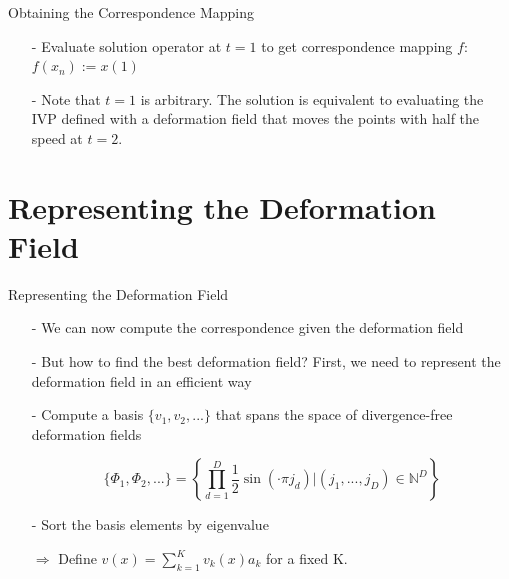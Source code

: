 \documentclass[xcolor=dvipsnames]{beamer}
\begin{document}
\begin{frame}{Obtaining the Correspondence Mapping}
\begin{enumerate}
\item[-] Evaluate solution operator at $t=1$ to get correspondence mapping $f$:\\ $f(x_n) := x(1)$
\item[-] Note that $t=1$ is arbitrary. The solution is equivalent to evaluating the IVP defined with a deformation field that moves the points with half the speed at $t=2$.
\end{enumerate}
\end{frame}

\section{Representing the Deformation Field}
\begin{frame}{Representing the Deformation Field}
\begin{enumerate}
\item[-] We can now compute the correspondence given the deformation field
\item[-]But how to find the best deformation field? First, we need to represent the deformation field in an efficient way
\item[-] Compute a basis $\{v_1,v_2,...\}$ that spans the space of divergence-free deformation fields
\item[] \begin{equation*}
\{\Phi_1,\Phi_2,...\} = \left\{\prod_{d=1}^D \frac{1}{2}\sin(\cdot\pi j_d) \vert (j_1,...,j_D) \in \mathbb{N}^D\right\}
\end{equation*}
\item[-] Sort the basis elements by eigenvalue
\item[$\Rightarrow$] Define $v(x) = \sum_{k=1}^K v_k(x)a_k$ for a fixed K.
\end{enumerate}
\end{frame}
\end{document}
